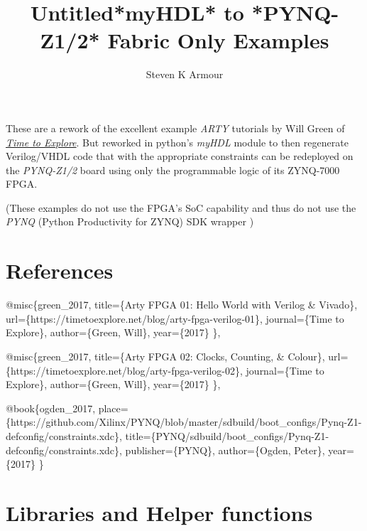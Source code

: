 \documentclass[11pt]{article}
\title{Untitled}
\begin{document}
    
    
    \maketitle
    
    

    
    \title{*myHDL* to *PYNQ-Z1/2* Fabric Only Examples}\author{Steven K Armour}\maketitle

    These are a rework of the excellent example \emph{ARTY} tutorials by
Will Green of \href{https://timetoexplore.net/}{\emph{Time to Explore}}.
But reworked in python's \emph{myHDL} module to then regenerate
Verilog/VHDL code that with the appropriate constraints can be
redeployed on the \emph{PYNQ-Z1/2} board using only the programmable
logic of its ZYNQ-7000 FPGA.

(These examples do not use the FPGA's SoC capability and thus do not use
the \emph{PYNQ} (Python Productivity for ZYNQ) SDK wrapper )

    \section{References}\label{references}

@misc\{green\_2017, title=\{Arty FPGA 01: Hello World with Verilog \&
Vivado\}, url=\{https://timetoexplore.net/blog/arty-fpga-verilog-01\},
journal=\{Time to Explore\}, author=\{Green, Will\}, year=\{2017\} \},

@misc\{green\_2017, title=\{Arty FPGA 02: Clocks, Counting, \& Colour\},
url=\{https://timetoexplore.net/blog/arty-fpga-verilog-02\},
journal=\{Time to Explore\}, author=\{Green, Will\}, year=\{2017\} \},

@book\{ogden\_2017,
place=\{https://github.com/Xilinx/PYNQ/blob/master/sdbuild/boot\_configs/Pynq-Z1-defconfig/constraints.xdc\},
title=\{PYNQ/sdbuild/boot\_configs/Pynq-Z1-defconfig/constraints.xdc\},
publisher=\{PYNQ\}, author=\{Ogden, Peter\}, year=\{2017\} \}

    \section{Libraries and Helper
functions}\label{libraries-and-helper-functions}
\end{document}
